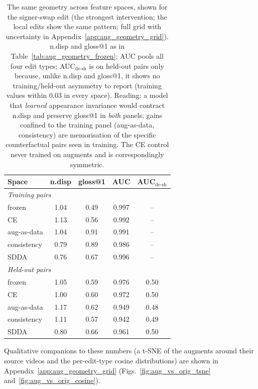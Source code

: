 \begin{table}[t]
\centering
\footnotesize
\setlength{\tabcolsep}{4pt}
\begin{tabular}{lcccc}
\toprule
\textbf{Space} & \textbf{n.disp} & \textbf{gloss@1} & \textbf{AUC} &
\textbf{AUC$_{\text{de-sh}}$} \\
\midrule
\multicolumn{5}{l}{\emph{Training pairs}} \\
\;\;frozen      & 1.04 & 0.49 & 0.997 & --   \\
\;\;CE          & 1.13 & 0.56 & 0.992 & --   \\
\;\;aug-as-data & 1.04 & 0.91 & 0.991 & --   \\
\;\;consistency & 0.79 & 0.89 & 0.986 & --   \\
\;\;SDDA        & 0.76 & 0.67 & 0.996 & --   \\
\midrule
\multicolumn{5}{l}{\emph{Held-out pairs}} \\
\;\;frozen      & 1.05 & 0.59 & 0.976 & 0.50 \\
\;\;CE          & 1.00 & 0.60 & 0.972 & 0.50 \\
\;\;aug-as-data & 1.17 & 0.62 & 0.949 & 0.48 \\
\;\;consistency & 1.11 & 0.57 & 0.942 & 0.49 \\
\;\;SDDA        & 0.80 & 0.66 & 0.961 & 0.50 \\
\bottomrule
\end{tabular}
\caption[Augmentation geometry across feature spaces]{The same geometry across feature spaces, shown for the
signer-swap edit (the strongest intervention; the local edits show the
same pattern; full grid with uncertainty in
Appendix~\ref{app:aug_geometry_grid}). n.disp and gloss@1
as in Table~\ref{tab:aug_geometry_frozen}; AUC pools all four edit
types; AUC$_{\text{de-sh}}$ is on held-out
pairs only because, unlike n.disp and gloss@1, it shows no
training/held-out asymmetry to report (training values within $0.03$
in every space). Reading: a model that \emph{learned} appearance invariance would
contract n.disp and preserve gloss@1 in \emph{both} panels;
gains confined to the training panel (aug-as-data, consistency) are
memorisation of the specific counterfactual pairs seen in training. The
CE control never trained on augments and is correspondingly symmetric.}
\label{tab:aug_geometry_spaces}
\end{table}


Qualitative companions to these numbers (a t-SNE of the augments around their source videos and the per-edit-type cosine distributions) are shown in Appendix~\ref{app:aug_geometry_grid} (Figs.~\ref{fig:aug_vs_orig_tsne} and~\ref{fig:aug_vs_orig_cosine}).


